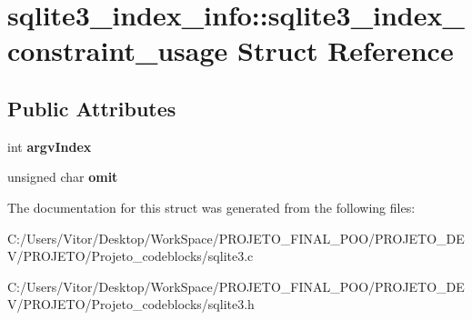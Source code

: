 \hypertarget{structsqlite3__index__info_1_1sqlite3__index__constraint__usage}{\section{sqlite3\-\_\-index\-\_\-info\-:\-:sqlite3\-\_\-index\-\_\-constraint\-\_\-usage Struct Reference}
\label{structsqlite3__index__info_1_1sqlite3__index__constraint__usage}
}
\subsection*{Public Attributes}
\begin{DoxyCompactItemize}
\item 
\hypertarget{structsqlite3__index__info_1_1sqlite3__index__constraint__usage_a2cbf680033c2937b3de226e091743a94}{int {\bfseries argv\-Index}}\label{structsqlite3__index__info_1_1sqlite3__index__constraint__usage_a2cbf680033c2937b3de226e091743a94}

\item 
\hypertarget{structsqlite3__index__info_1_1sqlite3__index__constraint__usage_ad07fa17d30e4fb3abe23ceaf84edf0ef}{unsigned char {\bfseries omit}}\label{structsqlite3__index__info_1_1sqlite3__index__constraint__usage_ad07fa17d30e4fb3abe23ceaf84edf0ef}

\end{DoxyCompactItemize}


The documentation for this struct was generated from the following files\-:\begin{DoxyCompactItemize}
\item 
C\-:/\-Users/\-Vitor/\-Desktop/\-Work\-Space/\-P\-R\-O\-J\-E\-T\-O\-\_\-\-F\-I\-N\-A\-L\-\_\-\-P\-O\-O/\-P\-R\-O\-J\-E\-T\-O\-\_\-\-D\-E\-V/\-P\-R\-O\-J\-E\-T\-O/\-Projeto\-\_\-codeblocks/sqlite3.\-c\item 
C\-:/\-Users/\-Vitor/\-Desktop/\-Work\-Space/\-P\-R\-O\-J\-E\-T\-O\-\_\-\-F\-I\-N\-A\-L\-\_\-\-P\-O\-O/\-P\-R\-O\-J\-E\-T\-O\-\_\-\-D\-E\-V/\-P\-R\-O\-J\-E\-T\-O/\-Projeto\-\_\-codeblocks/sqlite3.\-h\end{DoxyCompactItemize}
